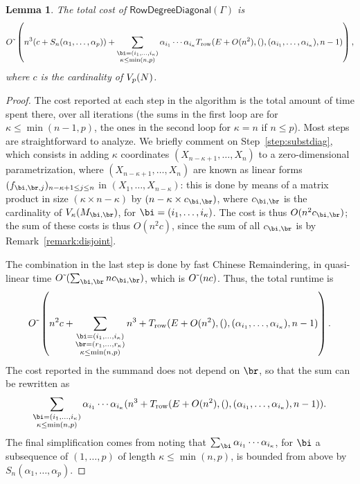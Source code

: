 \documentclass[12pt]{article}
\newtheorem{lemma}[definition]{Lemma}
\begin{document}
\begin{lemma}\label{lemma:rowdegreediagonal}
  The total cost of $\mathsf{RowDegreeDiagonal}(\Gamma)$
  is $$\softO\left (n^3(c + S_n(\alpha_1,\dots,\alpha_p))
 + \sum_{\substack{\bi=(i_1,\dots,i_\kappa)\\ \kappa\le\min(n,p)}}
\alpha_{i_1} \cdots \alpha_{i_\kappa} T_{\rm row}(E+O(n^2), (), (\alpha_{i_1},\dots,\alpha_{i_\kappa}), n-1)\right),$$
  where $c$ is the cardinality of $V_p({N})$.
\end{lemma}
\begin{proof}
  The cost reported at each step in the algorithm is the total amount
  of time spent there, over all iterations (the sums in the first loop
  are for $\kappa \le \min(n-1,p)$, the ones in the second loop for
  $\kappa=n$ if $n \le p$). Most steps are straightforward to
  analyze. We briefly comment on Step~\ref{step:substdiag}, which
  consists in adding $\kappa$ coordinates $(X_{n-\kappa+1},\dots,X_n)$
  to a zero-dimensional parametrization, where
  $(X_{n-\kappa+1},\dots,X_n)$ are known as linear forms
  $(f_{\bi,\br,j})_{n-\kappa+1 \le j \le n}$ in $(X_1, \ldots,
  X_{n-\kappa})$: this is done by means of a matrix product in size
  $(\kappa \times n-\kappa)$ by $(n-\kappa \times c_{\bi,\br})$, where
  $c_{\bi,\br}$ is the cardinality of $V_\kappa(\mM_{\bi,\br})$, for
  $\bi=(i_1,\dots,i_\kappa)$.  The cost is thus $O(n^2 c_{\bi,\br})$;
  the sum of these costs is thus $O(n^2 c)$, since the sum of all
  $c_{\bi,\br}$ is by Remark~\ref{remark:disjoint}.

  The combination in the last step is done by fast Chinese Remaindering,
  in quasi-linear time $\softO(\sum_{\bi,\br} n c_{\bi,\br})$,
  which is ${O}{\,\tilde{ }\,}(n c)$. Thus, the total runtime is 
  $$\softO\left (n^2 c + \sum_{\substack{\bi=(i_1,\dots,i_\kappa)\\ \br=(r_1,\dots,r_\kappa)\\\kappa\le\min(n,p)}}
  n^3 + T_{\rm row}(E+O(n^2), (), (\alpha_{i_1},\dots,\alpha_{i_\kappa}), n-1)\right).$$
  The cost reported in the summand does not depend on $\br$, so that 
  the sum can be rewritten as 
  $$\sum_{\substack{\bi=(i_1,\dots,i_\kappa)\\ \kappa\le\min(n,p)}}
  \alpha_{i_1} \cdots \alpha_{i_\kappa}( n^3 + T_{\rm row}(E+O(n^2), (), (\alpha_{i_1},\dots,\alpha_{i_\kappa}), n-1)).$$
  The final simplification comes from noting that $\sum_{\bi} \alpha_{i_1} \cdots \alpha_{i_\kappa}$,
  for $\bi$ a subsequence of $(1,\dots,p)$ of length $\kappa\le\min(n,p)$, 
  is bounded from above by $S_n(\alpha_1,\dots,\alpha_p)$.
\end{proof}
\end{document}
